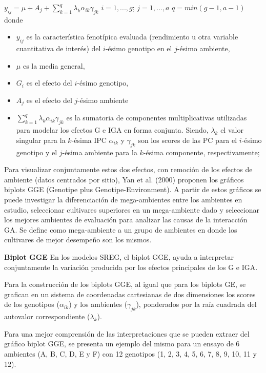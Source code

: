 $y_{ij}= \mu +  A_j + \sum_{k=1}^q \lambda_k \alpha_{ik} \gamma_{jk}$ \vspace{1cm} $ i=1,...,g$; $ j=1,...,a$ $q=min(g-1,a-1)$
donde 
\begin{itemize}
\item $y_{ij}$ es la característica fenotípica evaluada (rendimiento u otra variable cuantitativa de interés) del $i$-ésimo genotipo en el $j$-ésimo ambiente,
\item $\mu$ es la media general,
\item  $G_i$ es el efecto del $i$-ésimo genotipo,
\item $A_j$ es el efecto del $j$-ésimo ambiente
\item $\sum_{k=1}^q \lambda_k \alpha_{ik} \gamma_{jk}$ es la sumatoria de componentes multiplicativas utilizadas para modelar los efectos G e IGA en forma conjunta. Siendo, $\lambda_k$ el valor singular para la  $k$-ésima IPC $\alpha_{ik}$ y $\gamma_{jk}$ son los scores de las PC para el $i$-ésimo genotipo y el $j$-ésima ambiente para la $k$-ésima componente, respectivamente;
\end{itemize}


Para visualizar conjuntamente estos dos efectos, con remoción de los efectos de ambiente (datos centrados por sitio), Yan et al. (2000) proponen los gráficos biplots GGE (Genotipe plus Genotipe-Environment). A partir de estos gráficos se puede investigar la diferenciación de mega-ambientes entre los ambientes en estudio, seleccionar cultivares superiores en un mega-ambiente dado y seleccionar los mejores ambientes de evaluación para analizar las causas de la interacción GA. Se define como mega-ambiente a un grupo de ambientes en donde los cultivares de mejor desempeño son los mismos.

\textbf{Biplot GGE}
En los modelos SREG, el biplot GGE, ayuda a interpretar conjuntamente la variación producida por los efectos principales de los G e IGA.

Para la construcción de los biplots GGE, al igual que para los biplots GE, se grafican en un sistema de coordenadas cartesianas de dos dimensiones los scores de los genotipos ($\alpha_{ik}$) y los ambientes ($\gamma_{jk}$), ponderados por la raíz cuadrada del autovalor correspondiente ($\lambda_k$).

Para una mejor comprensión de las interpretaciones que se pueden extraer del gráfico biplot GGE, se presenta un ejemplo del mismo para un ensayo de 6 ambientes (A, B, C, D, E y F) con 12 genotipos (1, 2, 3, 4, 5, 6, 7, 8, 9, 10, 11 y 12).


